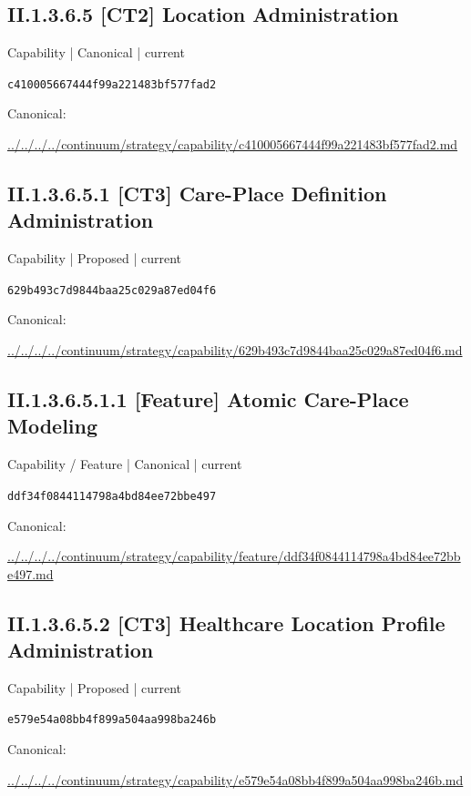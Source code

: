 \documentclass[10pt,a4paper]{article}
\begin{document}
\subsection*{II.1.3.6.5 [CT2] Location Administration}
{\small Capability | Canonical | current}\par
\texttt{c410005667444f99a221483bf577fad2}\par
Canonical: \par
{\footnotesize\url{../../../../continuum/strategy/capability/c410005667444f99a221483bf577fad2.md}}\par
\subsection*{II.1.3.6.5.1 [CT3] Care-Place Definition Administration}
{\small Capability | Proposed | current}\par
\texttt{629b493c7d9844baa25c029a87ed04f6}\par
Canonical: \par
{\footnotesize\url{../../../../continuum/strategy/capability/629b493c7d9844baa25c029a87ed04f6.md}}\par
\subsection*{II.1.3.6.5.1.1 [Feature] Atomic Care-Place Modeling}
{\small Capability / Feature | Canonical | current}\par
\texttt{ddf34f0844114798a4bd84ee72bbe497}\par
Canonical: \par
{\footnotesize\url{../../../../continuum/strategy/capability/feature/ddf34f0844114798a4bd84ee72bbe497.md}}\par
\subsection*{II.1.3.6.5.2 [CT3] Healthcare Location Profile Administration}
{\small Capability | Proposed | current}\par
\texttt{e579e54a08bb4f899a504aa998ba246b}\par
Canonical: \par
{\footnotesize\url{../../../../continuum/strategy/capability/e579e54a08bb4f899a504aa998ba246b.md}}\par
\end{document}
